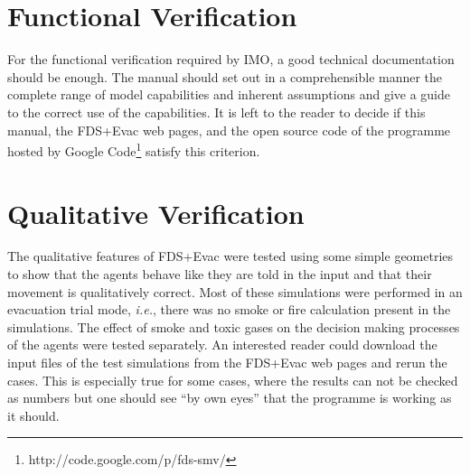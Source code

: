 \documentclass[12pt,a4paper,final,twoside]{stylevk}
\begin{document}
\section{Functional Verification}\label{Sec_FuncVeri}

\noindent For the functional verification required by IMO, a good
technical documentation should be enough.  The manual should set out
in a comprehensible manner the complete range of model capabilities
and inherent assumptions and give a guide to the correct use of the
capabilities.  It is left to the reader to decide if this manual, the
FDS+Evac web pages, and the open source code of the programme hosted
by Google Code\footnote{http://code.google.com/p/fds-smv/} satisfy
this criterion.


\section{Qualitative Verification}\label{Sec_QualVeri}

\noindent The qualitative features of FDS+Evac were tested using some
simple geometries to show that the agents behave like they are told in
the input and that their movement is qualitatively correct.  Most of
these simulations were performed in an evacuation trial mode,
\emph{i.e.}, there was no smoke or fire calculation present in the
simulations.  The effect of smoke and toxic gases on the decision
making processes of the agents were tested separately.  An interested
reader could download the input files of the test simulations from the
FDS+Evac web pages and rerun the cases.  This is especially true for
some cases, where the results can not be checked as numbers but one
should see ``by own eyes'' that the programme is working as it should.
\end{document}
